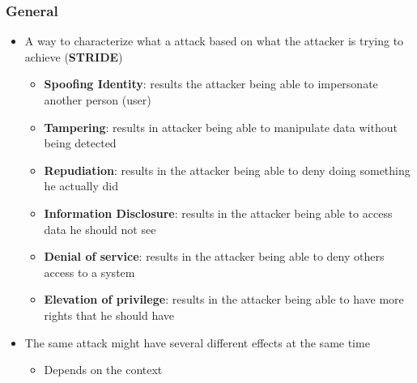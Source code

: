 \documentclass[11pt]{article}
\begin{document}
\subsubsection{General}
\label{sec:org759b881}
\begin{itemize}
\item A way to characterize what a attack based on what the attacker is trying to achieve (\textbf{STRIDE})
\begin{itemize}
\item \textbf{Spoofing Identity}: results the attacker being able to impersonate another person (user)
\item \textbf{Tampering}: results in attacker being able to manipulate data without being detected
\item \textbf{Repudiation}: results in the attacker being able to deny doing something he actually did
\item \textbf{Information Disclosure}: results in the attacker being able to access data he should not see
\item \textbf{Denial of service}: results in the attacker being able to deny others access to a system
\item \textbf{Elevation of privilege}: results in the attacker being able to have more rights that he should have
\end{itemize}

\item The same attack might have several different effects at the same time
\begin{itemize}
\item Depends on the context
\end{itemize}
\end{itemize}
\end{document}
